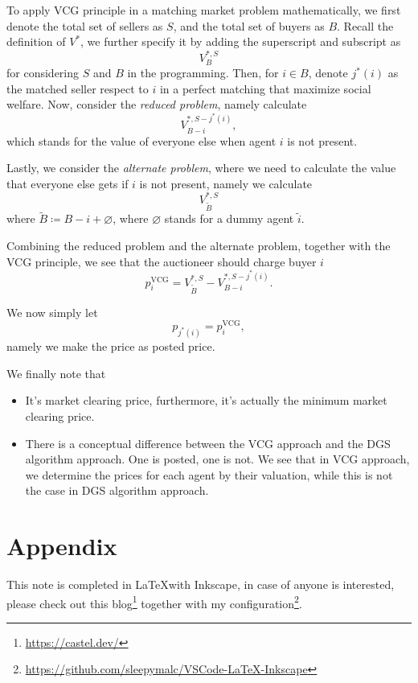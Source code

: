To apply VCG principle in a matching market problem mathematically, we first denote the total set of sellers as \(S\), and the total set of buyers as \(B\). Recall
the definition of \(V^{*}\), we further specify it by adding the superscript and subscript as
\[
	V^{*, S}_{B}
\]
for considering \(S\) and \(B\) in the programming. Then, for \(i\in B\), denote \(j^{*} (i)\) as the matched seller respect to \(i\) in a perfect matching that
maximize social welfare. Now, consider the \emph{reduced problem}, namely calculate
\[
	V^{*, S-j^{*}(i)}_{B-i},
\]
which stands for the value of everyone else when agent \(i\) is not present.

Lastly, we consider the \emph{alternate problem}, where we need to calculate the value that everyone else gets if \(i\) is not present, namely we
calculate
\[
	V^{*, S}_{\widetilde{B}}
\]
where \(\widetilde{B} \coloneqq B - i + \varnothing \), where \(\varnothing \) stands for a dummy agent \(\widetilde{i} \).

Combining the reduced problem and the alternate problem, together with the VCG principle, we see that the auctioneer should charge buyer \(i\)
\[
	p_{i}^\mathrm{VCG} = V_{\widetilde{B} }^{*, S} - V_{B-i}^{*, S-j^{*} (i)}.
\]

We now simply let
\[
	p_{j^{*} (i)} = p_{i}^\mathrm{VCG},
\]
namely we make the price as posted price.

\begin{remark}
	We finally note that
	\begin{itemize}
		\item It's market clearing price, furthermore, it's actually the minimum market clearing price.
		\item There is a conceptual difference between the VCG approach and the DGS algorithm approach. One is posted, one is not. We see that in VCG approach, we determine
		      the prices for each agent by their valuation, while this is not the case in DGS algorithm approach.
	\end{itemize}
\end{remark}


\newpage
\appendix
\section*{Appendix}
\renewcommand{\thesubsection}{\Alph{subsection}}
This note is completed in \LaTeX with Inkscape, in case of anyone is interested, please check out this blog\footnote{\url{https://castel.dev/}}
together with my configuration\footnote{\url{https://github.com/sleepymalc/VSCode-LaTeX-Inkscape}}.